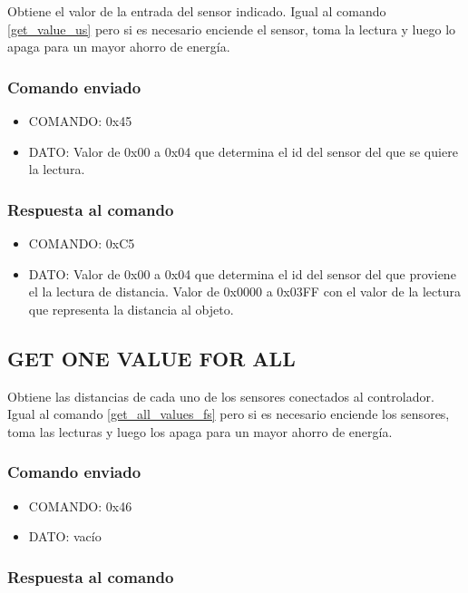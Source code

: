 \documentclass[a4paper,10pt]{article}
\begin{document}
Obtiene el valor de la entrada del sensor indicado.
Igual al comando \ref{get_value_us} pero si es necesario enciende el sensor, toma la lectura y luego lo apaga para un mayor ahorro de energ\'ia.

\subsubsection*{Comando enviado}

\begin{itemize}
	\item{COMANDO:} 0x45
	\item{DATO:} Valor de 0x00 a 0x04 que determina el id del sensor del que se quiere la lectura.
\end{itemize}

\subsubsection*{Respuesta al comando}

\begin{itemize}
	\item{COMANDO:} 0xC5
	\item{DATO:} Valor de 0x00 a 0x04 que determina el id del sensor del que proviene el la lectura de distancia.
	Valor de 0x0000 a 0x03FF con el valor de la lectura que representa la distancia al objeto.
\end{itemize}

\subsection{GET ONE VALUE FOR ALL}
\label{get_one_values_for_all_us}

Obtiene las distancias de cada uno de los sensores conectados al controlador.
Igual al comando \ref{get_all_values_fs} pero si es necesario enciende los sensores, toma las lecturas y luego los apaga para un mayor ahorro de energ\'ia.

\subsubsection*{Comando enviado}

\begin{itemize}
	\item{COMANDO:} 0x46
	\item{DATO:} vac\'io
\end{itemize}

\subsubsection*{Respuesta al comando}
\end{document}
